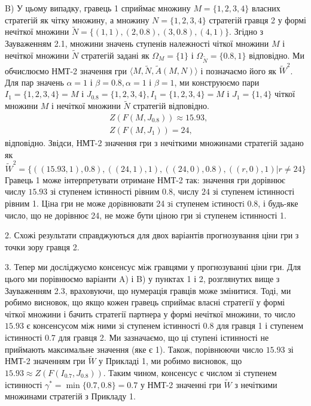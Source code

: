 \documentclass[14pt, a4paper, oneside]{extarticle}
\numberwithin{equation}{section}
\begin{document}
B) У цьому випадку, гравець 1 сприймає множину $M=\{1,2,3,4\}$ власних стратегій як чітку множину, а множину $N=\{1,2,3,4\}$ стратегій гравця 2 у формі нечіткої множини $\tilde{N}=\{(1,1), (2,0.8), (3,0.8), (4,1)\}$. Згідно з Зауваженням 2.1, множини значень ступенів належності чіткої множини $M$ і нечіткої множини $\tilde{N}$ стратегій задані як $\Omega_{M}=\{1\}$ і $\Omega_{\tilde{N}}=\{0.8,1\}$ відповідно. Ми обчислюємо НМТ-2 значення гри $\langle M, \tilde{N}, \tilde{A}(M, N)\rangle$ і позначаємо його як $\tilde{W}^{2}$. Для пар значень $\alpha=1$ і $\beta=0.8, \alpha=1$ і $\beta=1$, ми конструюємо пари $I_{1}=\{1,2,3,4\}=M$ і $J_{0.8}=\{1,2,3,4\}, I_{1}=\{1,2,3,4\}=M$ і $J_{1}=\{1,4\}$ чіткої множини $M$ і нечіткої множини $\tilde{N}$ стратегій відповідно.
\begin{align*}
&Z\left(F\left(M, J_{0.8}\right)\right)\approx 15.93,\\
&Z\left(F\left(M, J_{1}\right)\right)=24,
\end{align*}
відповідно. Звідси, НМТ-2 значення гри з нечіткими множинами стратегій задано як 
\begin{equation*}
\tilde{W}^{2}=\{((15.93,1), 0.8),((24,1), 1), ((24, 0), 0.8), ((r, 0), 1) | r \neq 24 \}
\end{equation*}
Гравець 1 може інтерпретувати отримане НМТ-2 так: значення гри дорівнює числу $15.93$ зі ступенем істинності рівним 0.8, числу $24$ зі ступенем істинності рівним 1. Цiна гри не може дорiвнювати 24 зi
ступенем iстиностi 0.8, і будь-яке число, що не дорівнює 24, не може бути ціною гри зі ступенем істинності 1.

2. Схожі результати справджуються для двох варіантів прогнозування ціни гри з точки зору гравця 2.

3. Тепер ми досліджуємо консенсус між гравцями у прогнозуванні ціни гри. Для цього ми порівнюємо варіанти A) і B) у пунктах 1 і 2, розглянутих вище з Зауваженням 2.3, враховуючи, що нумерація гравців може змінитися. Тоді, ми робимо висновок, що якщо кожен гравець сприймає власні стратегії у формі чіткої множини і бачить стратегії партнера у формі нечіткої множини, то число $15.93$ є консенсусом між ними зі ступенем істинності 0.8 для гравця 1 і ступенем істинності 0.7 для гравця 2. Ми зазначаємо, що ці ступені істинності не приймають максимальне значення (яке є 1). Також, порівнюючи число $15.93$ зі НМТ-2 значенням гри $\tilde{W}$ у Прикладі 1, ми робимо висновок, що $15.93\approx Z\left(F\left(I_{0.7}, J_{0.8}\right)\right)$. Таким чином, консенсус є числом зі ступенем істинності $\gamma^{*}=\min \{0.7,0.8\}=0.7$ у НМТ-2 значенні гри $\tilde{W}$ з нечіткими множинами стратегій з Прикладу 1.
\end{document}

